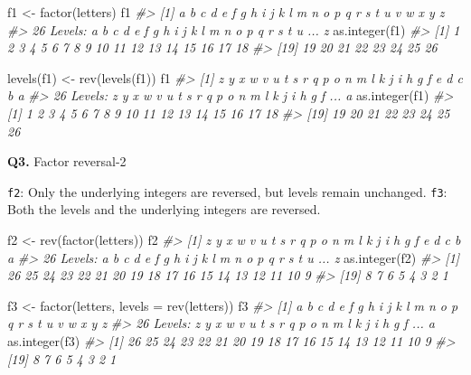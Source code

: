 \documentclass[
]{book}
\newenvironment{Shaded}{\begin{snugshade}}{\end{snugshade}}
\newcommand{\AttributeTok}[1]{\textcolor[rgb]{0.77,0.63,0.00}{#1}}
\newcommand{\CommentTok}[1]{\textcolor[rgb]{0.56,0.35,0.01}{\textit{#1}}}
\newcommand{\FunctionTok}[1]{\textcolor[rgb]{0.00,0.00,0.00}{#1}}
\newcommand{\NormalTok}[1]{#1}
\newcommand{\OtherTok}[1]{\textcolor[rgb]{0.56,0.35,0.01}{#1}}
\begin{document}
\begin{Shaded}
\begin{Highlighting}[]
\NormalTok{f1 }\OtherTok{\textless{}{-}} \FunctionTok{factor}\NormalTok{(letters)}
\NormalTok{f1}
\CommentTok{\#\textgreater{}  [1] a b c d e f g h i j k l m n o p q r s t u v w x y z}
\CommentTok{\#\textgreater{} 26 Levels: a b c d e f g h i j k l m n o p q r s t u ... z}
\FunctionTok{as.integer}\NormalTok{(f1)}
\CommentTok{\#\textgreater{}  [1]  1  2  3  4  5  6  7  8  9 10 11 12 13 14 15 16 17 18}
\CommentTok{\#\textgreater{} [19] 19 20 21 22 23 24 25 26}

\FunctionTok{levels}\NormalTok{(f1) }\OtherTok{\textless{}{-}} \FunctionTok{rev}\NormalTok{(}\FunctionTok{levels}\NormalTok{(f1))}
\NormalTok{f1}
\CommentTok{\#\textgreater{}  [1] z y x w v u t s r q p o n m l k j i h g f e d c b a}
\CommentTok{\#\textgreater{} 26 Levels: z y x w v u t s r q p o n m l k j i h g f ... a}
\FunctionTok{as.integer}\NormalTok{(f1)}
\CommentTok{\#\textgreater{}  [1]  1  2  3  4  5  6  7  8  9 10 11 12 13 14 15 16 17 18}
\CommentTok{\#\textgreater{} [19] 19 20 21 22 23 24 25 26}
\end{Highlighting}
\end{Shaded}

\textbf{Q3.} Factor reversal-2

\texttt{f2}: Only the underlying integers are reversed, but levels remain unchanged.
\texttt{f3}: Both the levels and the underlying integers are reversed.

\begin{Shaded}
\begin{Highlighting}[]
\NormalTok{f2 }\OtherTok{\textless{}{-}} \FunctionTok{rev}\NormalTok{(}\FunctionTok{factor}\NormalTok{(letters))}
\NormalTok{f2}
\CommentTok{\#\textgreater{}  [1] z y x w v u t s r q p o n m l k j i h g f e d c b a}
\CommentTok{\#\textgreater{} 26 Levels: a b c d e f g h i j k l m n o p q r s t u ... z}
\FunctionTok{as.integer}\NormalTok{(f2)}
\CommentTok{\#\textgreater{}  [1] 26 25 24 23 22 21 20 19 18 17 16 15 14 13 12 11 10  9}
\CommentTok{\#\textgreater{} [19]  8  7  6  5  4  3  2  1}

\NormalTok{f3 }\OtherTok{\textless{}{-}} \FunctionTok{factor}\NormalTok{(letters, }\AttributeTok{levels =} \FunctionTok{rev}\NormalTok{(letters))}
\NormalTok{f3}
\CommentTok{\#\textgreater{}  [1] a b c d e f g h i j k l m n o p q r s t u v w x y z}
\CommentTok{\#\textgreater{} 26 Levels: z y x w v u t s r q p o n m l k j i h g f ... a}
\FunctionTok{as.integer}\NormalTok{(f3)}
\CommentTok{\#\textgreater{}  [1] 26 25 24 23 22 21 20 19 18 17 16 15 14 13 12 11 10  9}
\CommentTok{\#\textgreater{} [19]  8  7  6  5  4  3  2  1}
\end{Highlighting}
\end{Shaded}
\end{document}
